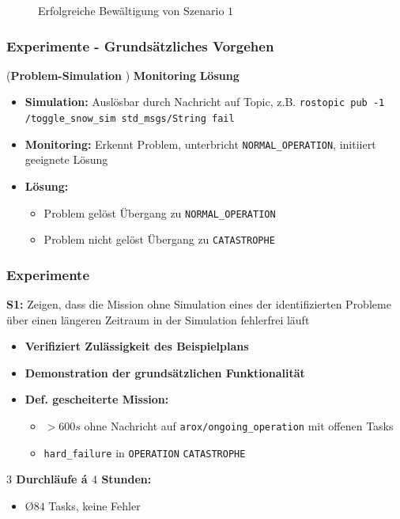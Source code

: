 \documentclass{beamer}
\newcommand{\code}[1]{\colorbox{light-gray}{\texttt{#1}}}
\begin{document}
\begin{frame}
\begin{figure}[H]
\begin{subfigure}[b]{0.24\textwidth}
    \end{subfigure}
  \caption*{Erfolgreiche Bewältigung von Szenario $1$}
  \end{figure}
\end{frame}

\begin{frame}
  \frametitle{Experimente - Grundsätzliches Vorgehen}
  (\textbf{Problem-Simulation} \textrightarrow) \thinspace \textbf{Monitoring} \textrightarrow \thinspace \textbf{Lösung}
  \begin{itemize}
    \item \textbf{Simulation:} Auslösbar durch Nachricht auf Topic, z.B. \code{rostopic pub -1 /toggle\_snow\_sim std\_msgs/String fail}
    \item \textbf{Monitoring:} Erkennt Problem, unterbricht \code{NORMAL\_OPERATION}, initiiert geeignete Lösung
    \item \textbf{Lösung:}
    \begin{itemize}
      \item Problem gelöst \textrightarrow \thinspace Übergang zu \code{NORMAL\_OPERATION}
      \item Problem nicht gelöst \textrightarrow \thinspace Übergang zu \code{CATASTROPHE}
    \end{itemize}
  \end{itemize}
\end{frame}

\begin{frame}
  \frametitle{Experimente}
  \textbf{S1:} Zeigen, dass die Mission ohne Simulation eines der identifizierten Probleme über einen längeren Zeitraum in der Simulation fehlerfrei läuft
  \begin{itemize}
    \item \textbf{Verifiziert Zulässigkeit des Beispielplans}
    \item \textbf{Demonstration der grundsätzlichen Funktionalität}
    \item \textbf{Def. gescheiterte Mission:}
    \begin{itemize}
      \item $> 600s$ ohne Nachricht auf \code{arox/ongoing\_operation} mit offenen Tasks
      \item \code{hard\_failure} in \code{OPERATION} \textrightarrow \thinspace \code{CATASTROPHE}
    \end{itemize}
  \end{itemize}
  \textbf{$3$ Durchläufe á $4$ Stunden:}
  \begin{itemize}
    \item \O $84$ Tasks, keine Fehler
  \end{itemize}
\end{frame}
\end{document}
